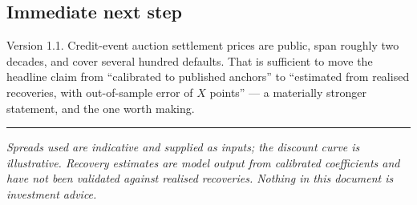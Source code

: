 \documentclass[11pt,a4paper]{article}
\begin{document}
\subsection{Immediate next step}

Version 1.1. Credit-event auction settlement prices are public, span roughly two decades,
and cover several hundred defaults. That is sufficient to move the headline claim from
``calibrated to published anchors'' to ``estimated from realised recoveries, with
out-of-sample error of $X$ points'' --- a materially stronger statement, and the one
worth making.

\vspace{2em}
\hrule
\vspace{0.8em}
{\small\itshape
Spreads used are indicative and supplied as inputs; the discount curve is illustrative.
Recovery estimates are model output from calibrated coefficients and have not been
validated against realised recoveries. Nothing in this document is investment advice.}
\end{document}
